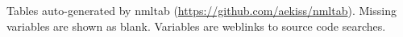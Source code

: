 \documentclass[10pt]{article}
\newcommand{\nmldiffer}[1]{#1} %
\newcommand{\nmllink}[2]{#1} %
\newcommand{\nml}[1]{{\footnotesize\textsf{}}}
\newcommand{\doscript}[1]{{\footnotesize\textsf{}}}
\begin{document}
\renewcommand{\nmllink}[2]{\href{https://github.com/mom-ocean/MOM5/search?q=#2}{#1}} %
Tables auto-generated by nmltab (\url{https://github.com/aekiss/nmltab}).
Missing variables are shown as blank. Variables are \textcolor{link}{weblinks} to source code searches.






\tableofcontents

%
%

%
\end{document}
